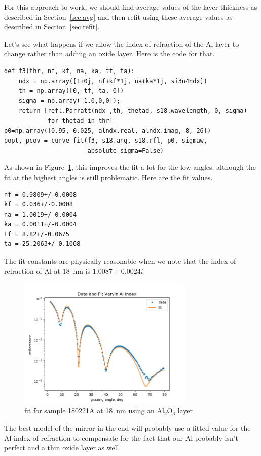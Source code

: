 \documentclass[english]{scrartcl}
\begin{document}
For this approach to work, we should find average values of the
layer thickness as described in Section~\ref{sec:avg} and then refit
using these average values as described in Section~\ref{sec:refit}.

Let's see what happens if we allow the index of refraction of the Al
layer to change rather than adding an oxide layer. Here is the code for
that.
\begin{lstlisting}
def f3(thr, nf, kf, na, ka, tf, ta):
    ndx = np.array([1+0j, nf+kf*1j, na+ka*1j, si3n4ndx])
    th = np.array([0, tf, ta, 0])
    sigma = np.array([1.0,0,0]);
    return [refl.Parratt(ndx ,th, thetad, s18.wavelength, 0, sigma)
            for thetad in thr]
p0=np.array([0.95, 0.025, alndx.real, alndx.imag, 8, 26])
popt, pcov = curve_fit(f3, s18.ang, s18.rfl, p0, sigmaw,
                       absolute_sigma=False)
\end{lstlisting}
As shown in Figure~\ref{fig:fit18alndx}, this improves the fit a lot
for the low angles, although the fit at the highest angles is still
problematic. Here are the fit values.
\begin{lstlisting}
nf = 0.9809+/-0.0008
kf = 0.036+/-0.0008
na = 1.0019+/-0.0004
ka = 0.0011+/-0.0004
tf = 8.82+/-0.0675
ta = 25.2063+/-0.1068
\end{lstlisting}
The fit constants are physically reasonable when we note that the
index of refraction of Al at 18~nm is $1.0087+0.0024i$.
\begin{figure}[htb]
  \begin{center}
    \includegraphics[width=0.75\textwidth]{images/fit18alndx}
  \end{center}
  \caption{\label{fig:fit18alndx}fit for sample 180221A at 18~nm using
  an Al$_2$O$_3$ layer}
\end{figure}
The best model of the mirror in the end will probably use a fitted value
for the Al index of refraction to compensate for the fact that
our Al probably isn't perfect and a thin oxide layer as well.
\end{document}
